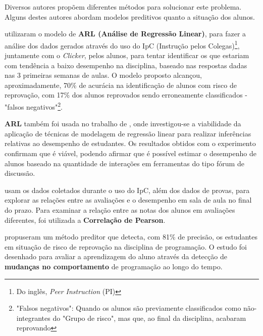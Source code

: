 \documentclass[
	12pt,				%
	openright,			%
	oneside,
	a4paper,			%
	english,			%
	french,				%
	spanish,			%
	brazil,				%
	]{abntex2}
\begin{document}

Diversos autores propõem diferentes métodos para solucionar este problema. Alguns destes autores abordam modelos preditivos quanto a situação dos alunos.

 utilizaram o modelo de \textbf{ARL (Análise de Regressão Linear)}, para fazer a análise dos dados gerados através do uso do IpC (Instrução pelos Colegas)\footnote[1]{Do inglês, \textit{Peer Instruction} (PI)}, juntamente com o \textit{Clicker}, pelos alunos, para tentar identificar os que estariam com tendência a baixo desempenho na disciplina, baseado nas respostas dadas nas 3 primeiras semanas de aulas. O modelo proposto alcançou, aproximadamente, 70\% de acurácia na identificação de alunos com risco de reprovação, com 17\% dos alunos reprovados sendo erroneamente classificados - "falsos negativos"\footnote[2]{"Falsos negativos": Quando os alunos são previamente classificados como não-integrantes do "Grupo de risco", mas que, ao final da disciplina, acabaram reprovando}.

\textbf{ARL} também foi usada no trabalho de , onde investigou-se a viabilidade da aplicação de técnicas de modelagem de regressão linear para realizar inferências relativas ao desempenho de estudantes. Os resultados obtidos com o experimento confirmam que é viável, podendo afirmar que é possível estimar o desempenho de alunos baseado na quantidade de interações em ferramentas do tipo fórum de discussão. 

 usam os dados coletados durante o uso do IpC, além dos dados de provas, para explorar as relações entre as avaliações e o desempenho em sala de aula no final do prazo. Para examinar a relação entre as notas dos alunos em avaliações diferentes, foi utilizada a \textbf{Correlação de Pearson}.

 propuseram um método preditor que detecta, com 81\% de precisão, os estudantes em situação de risco de reprovação na disciplina de programação. O estudo foi desenhado para avaliar a aprendizagem do aluno através da detecção de \textbf{mudanças no comportamento} de programação ao longo do tempo. 
\end{document}
